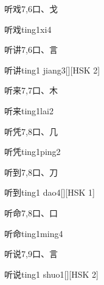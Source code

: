 \begin{entry}{听戏}{7,6}{⼝、⼽}
  \begin{phonetics}{听戏}{ting1xi4}
  \end{phonetics}
\end{entry}

\begin{entry}{听讲}{7,6}{⼝、⾔}
  \begin{phonetics}{听讲}{ting1 jiang3}[][HSK 2]
  \end{phonetics}
\end{entry}

\begin{entry}{听来}{7,7}{⼝、⽊}
  \begin{phonetics}{听来}{ting1lai2}
  \end{phonetics}
\end{entry}

\begin{entry}{听凭}{7,8}{⼝、⼏}
  \begin{phonetics}{听凭}{ting1ping2}
  \end{phonetics}
\end{entry}

\begin{entry}{听到}{7,8}{⼝、⼑}
  \begin{phonetics}{听到}{ting1 dao4}[][HSK 1]
  \end{phonetics}
\end{entry}

\begin{entry}{听命}{7,8}{⼝、⼝}
  \begin{phonetics}{听命}{ting1ming4}
  \end{phonetics}
\end{entry}

\begin{entry}{听说}{7,9}{⼝、⾔}
  \begin{phonetics}{听说}{ting1 shuo1}[][HSK 2]
  \end{phonetics}
\end{entry}

